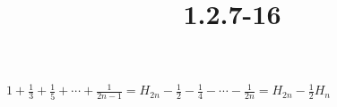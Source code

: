 \documentclass{article}
\title{1.2.7-16}
\begin{document}
\maketitle

\( 1 + \frac{1}{3} + \frac{1}{5} + \cdots + \frac{1}{2n-1} = H_{2n} - \frac{1}{2} - \frac{1}{4} - \cdots - \frac{1}{2n} = H_{2n} - \frac{1}{2}H_n \)
\end{document}
